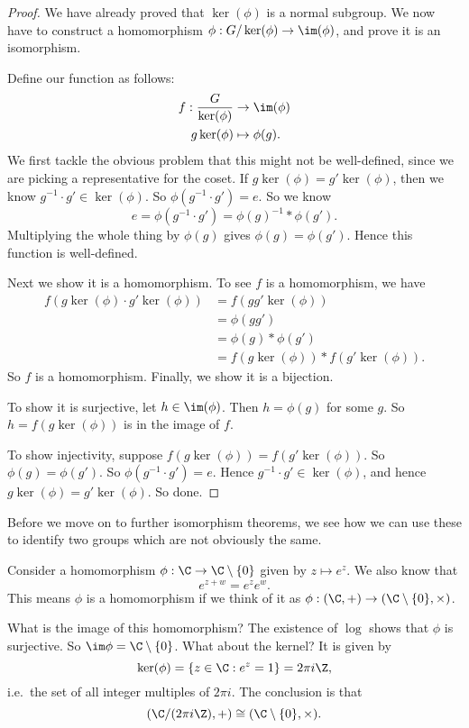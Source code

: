 \documentclass[a4paper]{article}
\begin{document}
\begin{proof}
  We have already proved that $\ker (\phi)$ is a normal subgroup. We now have to construct a homomorphism $\phi: G/\ker(\phi) \to \im (\phi)$, and prove it is an isomorphism.

  Define our function as follows:
  \begin{align*}
    f: \frac{G}{\ker (\phi)} &\to \im (\phi)\\
    g\ker (\phi) &\mapsto \phi(g).
  \end{align*}
  We first tackle the obvious problem that this might not be well-defined, since we are picking a representative for the coset. If $g \ker(\phi) = g' \ker(\phi)$, then we know $g^{-1} \cdot g' \in \ker(\phi)$. So $\phi(g^{-1} \cdot g') = e$. So we know
  \[
    e = \phi(g^{-1} \cdot g') = \phi(g)^{-1} * \phi(g').
  \]
  Multiplying the whole thing by $\phi(g)$ gives $\phi(g) = \phi(g')$. Hence this function is well-defined.

  Next we show it is a homomorphism. To see $f$ is a homomorphism, we have
  \begin{align*}
    f(g\ker (\phi) \cdot g'\ker(\phi)) &= f(gg'\ker(\phi)) \\
    &= \phi(gg') \\
    &= \phi(g) * \phi(g') \\
    &= f(g\ker(\phi)) * f(g'\ker(\phi)).
  \end{align*}
  So $f$ is a homomorphism. Finally, we show it is a bijection.

  To show it is surjective, let $h \in \im (\phi)$. Then $h = \phi(g)$ for some $g$. So $h = f(g\ker (\phi))$ is in the image of $f$.

  To show injectivity, suppose $f(g\ker (\phi)) = f(g'\ker(\phi))$. So $\phi(g) = \phi(g')$. So $\phi(g^{-1} \cdot g') = e$. Hence $g^{-1} \cdot g' \in \ker(\phi)$, and hence $g \ker(\phi) = g'\ker(\phi)$. So done.
\end{proof}

Before we move on to further isomorphism theorems, we see how we can use these to identify two groups which are not obviously the same.

\begin{eg}
  Consider a homomorphism $\phi: \C \to \C\setminus \{0\}$ given by $z \mapsto e^z$. We also know that
  \[
    e^{z + w} = e^z e^w.
  \]
  This means $\phi$ is a homomorphism if we think of it as $\phi: (\C, +) \to (\C\setminus \{0\}, \times)$.

  What is the image of this homomorphism? The existence of $\log$ shows that $\phi$ is surjective. So $\im \phi = \C\setminus \{0\}$. What about the kernel? It is given by
  \[
    \ker(\phi) = \{z \in \C: e^z = 1\} = 2\pi i \Z,
  \]
  i.e.\ the set of all integer multiples of $2\pi i$. The conclusion is that
  \[
    (\C / (2\pi i \Z), +) \cong (\C\setminus \{0\}, \times).
  \]
\end{eg}
\end{document}
